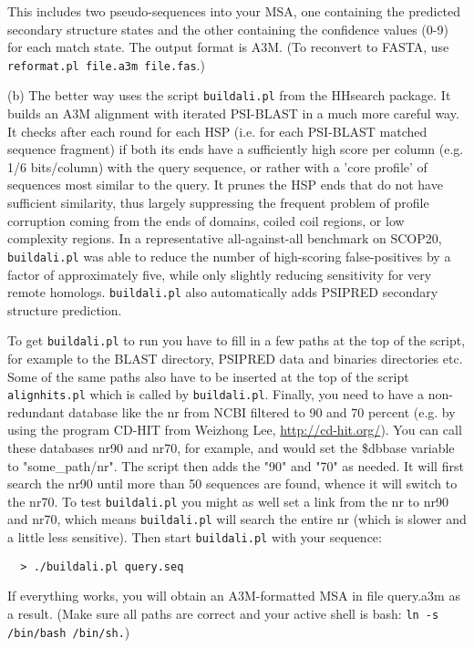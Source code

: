 \documentclass[11pt,a4paper]{article}
\begin{document}
This includes two pseudo-sequences into your MSA, one containing the predicted
secondary structure states and the other containing the confidence values (0-9) for 
each match state. The output format is A3M. (To reconvert to FASTA, use 
\verb`reformat.pl file.a3m file.fas`.)

(b) The better way uses the script \verb`buildali.pl` from the HHsearch package. It builds 
an A3M alignment with iterated PSI-BLAST in a much more careful way. It checks after 
each round for each HSP (i.e. for each PSI-BLAST matched sequence fragment) if both its
ends have a sufficiently high score per column (e.g. 1/6 bits/column) with the query 
sequence, or rather with a 'core profile' of sequences most similar to the query. It 
prunes the HSP ends that do not have sufficient similarity, thus largely suppressing 
the frequent problem of profile corruption coming from the ends of domains, coiled 
coil regions, or low complexity regions. In a representative all-against-all benchmark 
on SCOP20, \verb`buildali.pl` was able to reduce the number of high-scoring false-positives 
by a factor of approximately five, while only slightly reducing sensitivity for very 
remote homologs. \verb`buildali.pl` also automatically adds PSIPRED secondary structure 
prediction. 

To get \verb`buildali.pl` to run you have to fill in a few paths at the top of the script, 
for example to the BLAST directory, PSIPRED data and binaries directories etc. Some of 
the same paths also have to be inserted at the top of the script \verb`alignhits.pl` which 
is called by \verb`buildali.pl`. Finally, you need to have a non-redundant database like the 
nr from NCBI filtered to 90 and 70 percent (e.g. by using the program CD-HIT from 
Weizhong Lee, \url{http://cd-hit.org/}). You can call these databases nr90 and nr70, for 
example, and would set the \$dbbase variable to "some\_path/nr". The script then adds 
the "90" and "70" as needed. It will first search the nr90 until more than 50 
sequences are found, whence it will switch to the nr70. To test \verb`buildali.pl` you might 
as well set a link from the nr to nr90 and nr70, which means \verb`buildali.pl` will search 
the entire nr (which is slower and a little less sensitive). Then start \verb`buildali.pl` 
with your sequence:
\begin{verbatim}
  > ./buildali.pl query.seq
\end{verbatim}

If everything works, you will obtain an A3M-formatted MSA in file query.a3m 
as a result. (Make sure all paths are correct and your active shell is bash: 
\verb`ln -s /bin/bash /bin/sh.`)
\end{document}
